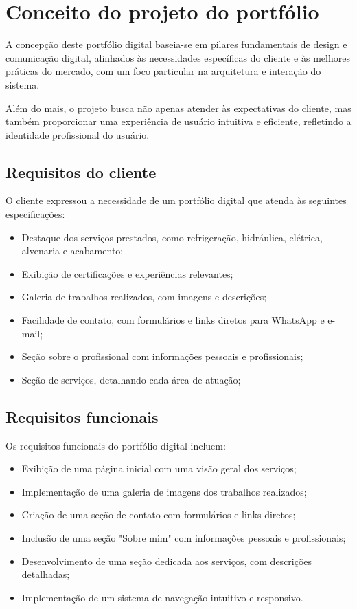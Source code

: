 \chapter{Conceito do projeto do portfólio}
\label{chap:fundteor}
A concepção deste portfólio digital baseia-se em pilares fundamentais de design e comunicação digital, alinhados às necessidades específicas do cliente e às melhores práticas do mercado, com um foco particular na arquitetura e interação do sistema.

Além do mais, o projeto busca não apenas atender às expectativas do cliente, mas também proporcionar uma experiência de usuário intuitiva e eficiente, refletindo a identidade profissional do usuário.


\section{Requisitos do cliente}
O cliente expressou a necessidade de um portfólio digital que atenda às seguintes especificações:
 \begin{itemize}
    \item Destaque dos serviços prestados, como refrigeração, hidráulica, elétrica, alvenaria e acabamento;
    \item Exibição de certificações e experiências relevantes;
    \item Galeria de trabalhos realizados, com imagens e descrições;
    \item Facilidade de contato, com formulários e links diretos para WhatsApp e e-mail;
    \item Seção sobre o profissional com informações pessoais e profissionais;
    \item Seção de serviços, detalhando cada área de atuação;
 \end{itemize}

 \section{Requisitos funcionais}
Os requisitos funcionais do portfólio digital incluem:
\begin{itemize}
    \item Exibição de uma página inicial com uma visão geral dos serviços;
    \item Implementação de uma galeria de imagens dos trabalhos realizados;
    \item Criação de uma seção de contato com formulários e links diretos;
    \item Inclusão de uma seção "Sobre mim" com informações pessoais e profissionais;
    \item Desenvolvimento de uma seção dedicada aos serviços, com descrições detalhadas;
    \item Implementação de um sistema de navegação intuitivo e responsivo.
\end{itemize}

